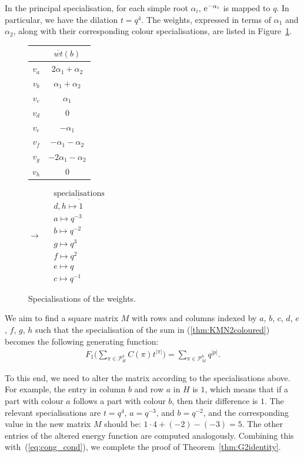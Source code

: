 \documentclass[pdftex]{sigma}
\numberwithin{equation}{section}
\theoremstyle{definition}
\begin{document}
In the principal specialisation, for each simple root $\alpha_i$, ${\rm e}^{-\alpha_i}$ is mapped to $q$. In particular, we have the dilation $t = q^4$. The weights, expressed in terms of $\alpha_1$ and $\alpha_2$, along with their corresponding colour specialisations, are listed in Figure~\ref{fig:specialisations}.
\begin{figure}[!t]
\centering
 \begin{tabular}{|c|c|}
 \hline
 & $\overline{wt}(b)$ \\
 \hline
 $v_a$ & $ 2\alpha_1+\alpha_2$ \\
 $v_b$ & $ \alpha_1+\alpha_2$ \\
 $v_c$ & $\alpha_1$ \\
 $v_d$ & $0$ \\
 $v_e$ & $-\alpha_1$ \\
 $v_f$ & $-\alpha_1-\alpha_2$ \\
 $v_g$ & $-2\alpha_1-\alpha_2$ \\
 $v_h$ & $0$ \\
 \hline
 \end{tabular}
 \qquad
 {$\longrightarrow$}
 \qquad
 $ \begin{aligned}
 &\underline{\text{specialisations}}
 \\
 &d, h \mapsto 1 \\
 &a \mapsto q^{-3} \\
 &b \mapsto q^{-2} \\
 &g \mapsto q^3 \\
 &f \mapsto q^2 \\
 &e \mapsto q \\
 &c \mapsto q^{-1}
 \end{aligned}$

 \caption{Specialisations of the weights.}
\label{fig:specialisations}
\end{figure}

We aim to find a square matrix $M$ with rows and columns indexed by $a$, $b$, $c$, $d$, $e$, $f$, $g$, $h$ such that the specialisation of the sum in (\ref{thm:KMN2coloured}) becomes the following generating function:
\begin{align*}
F_1\biggl(\sum_{\pi \in \mathcal{P}_{H}^h} C(\pi) t^{|\pi|}\biggr) = \sum_{\pi \in \mathcal{P}_{M}^h}q^{|p|}.
\end{align*}

To this end, we need to alter the matrix according to the specialisations above. For example, the entry in column $b$ and row $a$ in $H$ is $1$, which means that if a part with colour $a$ follows a part with colour $b$, then their difference is $1$. The relevant specialisations are $t = q^4$, $a = q^{-3}$, and $b = q^{-2}$, and the corresponding value in the new matrix $M$ should be: $1 \cdot 4 + (-2) - (-3) = 5$. The other entries of the altered energy function are computed analogously. Combining this with~(\ref{eq:cong_cond}), we complete the proof of Theorem~\ref{thm:G2identity}.
\end{document}
